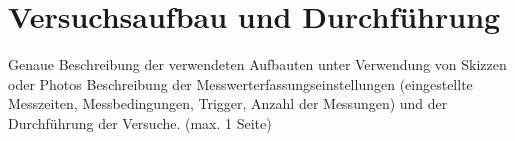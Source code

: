 \section{Versuchsaufbau und Durchführung}
Genaue Beschreibung der verwendeten Aufbauten unter Verwendung von Skizzen oder Photos Beschreibung der Messwerterfassungseinstellungen (eingestellte Messzeiten, Messbedingungen, Trigger, Anzahl der Messungen) und der Durchführung der Versuche.  (max. 1 Seite)